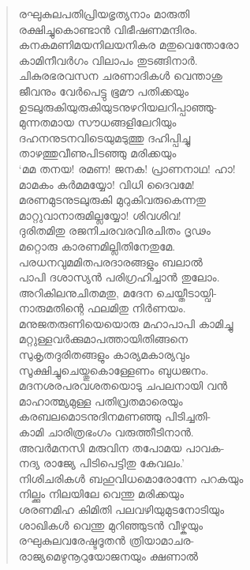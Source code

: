 \begin{verse}
രഘുകുലപതിപ്രിയഭൃത്യനാം മാരുതി\\
രക്ഷിച്ചുകൊണ്ടാന്‍ വിഭീഷണമന്ദിരം.\\
കനകമണിമയനിലയനികര മതുവെന്തോരോ\\
കാമിനീവര്‍ഗം വിലാപം തുടങ്ങിനാര്‍.\\
ചികുരഭരവസന ചരണാദികള്‍ വെന്താശു\\
ജീവനും വേര്‍പെട്ടു ഭൂമൗ പതിക്കയും\\
ഉടലുരുകിയുരുകിയുടനുഴറിയലറിപ്പാഞ്ഞു-\\
മുന്നതമായ സൗധങ്ങളിലേറിയും\\
ദഹനനുടനവിടെയുമടുത്തു ദഹിപ്പിച്ചു\\
താഴത്തുവീണുപിടഞ്ഞു മരിക്കയും\\
‘മമ തനയ! രമണ! ജനക! പ്രാണനാഥ! ഹാ!\\
മാമകം കര്‍മമയ്യോ! വിധി ദൈവമേ!\\
മരണമുടനുടലുരുകി മുറുകിവരുകെന്നതു\\
മാറ്റുവാനാരുമില്ലയ്യോ! ശിവശിവ!\\
ദുരിതമിതു രജനിചരവരവിരചിതം ദൃഢം\\
മറ്റൊരു കാരണമില്ലിതിനേതുമേ.\\
പരധനവുമമിതപരദാരങ്ങളും ബലാല്‍\\
പാപി ദശാസ്യന്‍ പരിഗ്രഹിച്ചാന്‍ തുലോം.\\
അറികിലനുചിതമതു, മദേന ചെയ്തീടായ്വി-\\
നാരുമതിന്റെ ഫലമിതു നിര്‍ണയം.\\
മനുജതരുണിയെയൊരു മഹാപാപി കാമിച്ചു\\
മറ്റുള്ളവര്‍ക്കുമാപത്തായിതിങ്ങനെ\\
സുകൃതദുരിതങ്ങളും കാര്യമകാര്യവും\\
സൂക്ഷിച്ചുചെയ്തുകൊള്ളേണം ബുധജനം.\\
മദനശരപരവശതയൊടു ചപലനായി വന്‍\\
മാഹാത്മ്യമുള്ള പതിവ്രതമാരെയും\\
കരബലമൊടനുദിനമണഞ്ഞു പിടിച്ചതി-\\
കാമി ചാരിത്രഭംഗം വരുത്തീടിനാന്‍.\\
അവര്‍മനസി മരുവിന തപോമയ പാവക-\\
നദ്യ രാജ്യേ പിടിപെട്ടിതു കേവലം.’\\
നിശിചരികള്‍ ബഹുവിധമൊരോന്നേ പറകയും\\
നില്ക്കും നിലയിലേ വെന്തു മരിക്കയും\\
ശരണമിഹ കിമിതി പലവഴിയുമുടനോടിയും\\
ശാഖികള്‍ വെന്തു മുറിഞ്ഞുടന്‍ വീഴ്കയും\\
രഘുകുലവരേഷ്ടദൂതന്‍ ത്രിയാമാചര-\\
രാജ്യമെഴുനൂറുയോജനയും ക്ഷണാല്‍\\

\end{verse}
